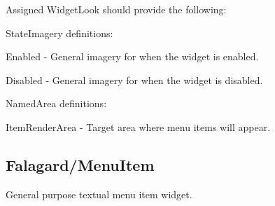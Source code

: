 Assigned Widget\+Look should provide the following\+: 
\begin{DoxyItemize}
\item State\+Imagery definitions\+: 
\begin{DoxyItemize}
\item Enabled -\/ General imagery for when the widget is enabled. 
\item Disabled -\/ General imagery for when the widget is disabled. 
\end{DoxyItemize}


\item Named\+Area definitions\+: 
\begin{DoxyItemize}
\item Item\+Render\+Area -\/ Target area where menu items will appear. 
\end{DoxyItemize}
\end{DoxyItemize}\hypertarget{fal_wr_ref_fal_wr_ref_sec_11}{}\subsection{Falagard/\+Menu\+Item}\label{fal_wr_ref_fal_wr_ref_sec_11}
General purpose textual menu item widget.

